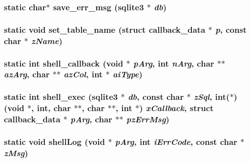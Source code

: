 \subsubsection{\setlength{\rightskip}{0pt plus 5cm}static char$\ast$ save\_\-err\_\-msg (\bf{sqlite3} $\ast$ {\em db})\hspace{0.3cm}{\tt  [static]}}\label{shell_8c_e6232beb3ddb5df3f0d86a1e71531812}


\subsubsection{\setlength{\rightskip}{0pt plus 5cm}static void set\_\-table\_\-name (struct \bf{callback\_\-data} $\ast$ {\em p}, const char $\ast$ {\em z\-Name})\hspace{0.3cm}{\tt  [static]}}\label{shell_8c_60e07b7c3c1de22873be8a23f7d1561b}


\subsubsection{\setlength{\rightskip}{0pt plus 5cm}static int shell\_\-callback (void $\ast$ {\em p\-Arg}, int {\em n\-Arg}, char $\ast$$\ast$ {\em az\-Arg}, char $\ast$$\ast$ {\em az\-Col}, int $\ast$ {\em ai\-Type})\hspace{0.3cm}{\tt  [static]}}\label{shell_8c_8a9e0633525947e99e8013a851beb26b}


\subsubsection{\setlength{\rightskip}{0pt plus 5cm}static int shell\_\-exec (\bf{sqlite3} $\ast$ {\em db}, const char $\ast$ {\em z\-Sql}, int($\ast$)(void $\ast$, int, char $\ast$$\ast$, char $\ast$$\ast$, int $\ast$) {\em x\-Callback}, struct \bf{callback\_\-data} $\ast$ {\em p\-Arg}, char $\ast$$\ast$ {\em pz\-Err\-Msg})\hspace{0.3cm}{\tt  [static]}}\label{shell_8c_cde3e1282b06ed812d82a3dc397436a6}


\subsubsection{\setlength{\rightskip}{0pt plus 5cm}static void shell\-Log (void $\ast$ {\em p\-Arg}, int {\em i\-Err\-Code}, const char $\ast$ {\em z\-Msg})\hspace{0.3cm}{\tt  [static]}}\label{shell_8c_22637190dc517c24ce5115074d059625}


